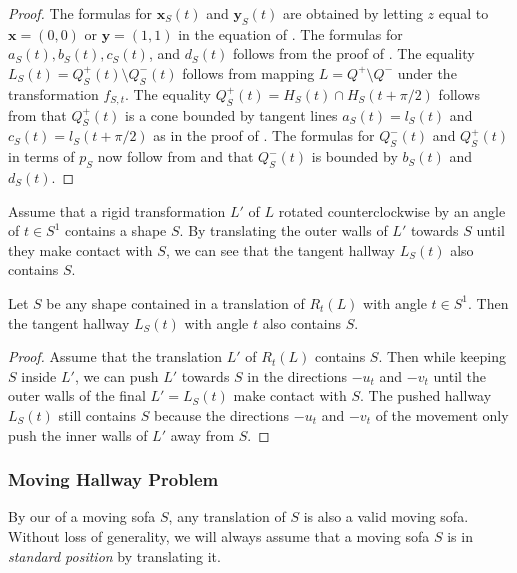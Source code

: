 \begin{proof}
The formulas for \(\mathbf{x}_S(t)\) and \(\mathbf{y}_S(t)\) are obtained by letting \(z\) equal to \(\mathbf{x} = (0, 0)\) or \(\mathbf{y} = (1, 1)\) in the equation of . The formulas for \(a_S(t), b_S(t), c_S(t)\), and \(d_S(t)\) follows from the proof of . The equality \(L_S(t) = Q_S^+(t) \setminus Q_S^-(t)\) follows from mapping \(L = Q^+ \setminus Q^-\) under the transformation \(f_{S, t}\). The equality \(Q^+_S(t) = H_S(t) \cap H_S(t + \pi/2)\) follows from that \(Q^+_S(t)\) is a cone bounded by tangent lines \(a_S(t) = l_S(t)\) and \(c_S(t) = l_S(t + \pi/2)\) as in the proof of . The formulas for \(Q_S^-(t)\) and \(Q_S^+(t)\) in terms of \(p_S\) now follow from  and that \(Q_S^-(t)\) is bounded by \(b_S(t)\) and \(d_S(t)\).
\end{proof}

Assume that a rigid transformation \(L'\) of \(L\) rotated counterclockwise by an angle of \(t \in S^1\) contains a shape \(S\). By translating the outer walls of \(L'\) towards \(S\) until they make contact with \(S\), we can see that the tangent hallway \(L_S(t)\) also contains \(S\).

\begin{proposition}

Let \(S\) be any shape contained in a translation of \(R_t(L)\) with angle \(t \in S^1\). Then the tangent hallway \(L_S(t)\) with angle \(t\) also contains \(S\).

\label{pro:tangent-hallway-contains}
\end{proposition}

\begin{proof}
Assume that the translation \(L'\) of \(R_t(L)\) contains \(S\). Then while keeping \(S\) inside \(L'\), we can push \(L'\) towards \(S\) in the directions \(-u_t\) and \(-v_t\) until the outer walls of the final \(L' = L_S(t)\) make contact with \(S\). The pushed hallway \(L_S(t)\) still contains \(S\) because the directions \(-u_t\) and \(-v_t\) of the movement only push the inner walls of \(L'\) away from \(S\).
\end{proof}

\subsubsection{Moving Hallway Problem}

By our  of a moving sofa \(S\), any translation of \(S\) is also a valid moving sofa. Without loss of generality, we will always assume that a moving sofa \(S\) is in \emph{standard position} by translating it.

